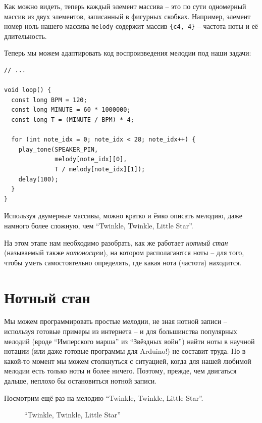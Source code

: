 \documentclass[a4paper,twoside]{book}
\begin{document}
Как можно видеть, теперь каждый элемент массива -- это по сути одномерный массив
из двух элементов, записанный в фигурных скобках. Например, элемент номер ноль
нашего массива \texttt{melody} содержит массив \texttt{\{c4, 4\}} -- частота ноты
и её длительность.

Теперь мы можем адаптировать код воспроизведения мелодии под наши задачи:

\begin{verbatim}
// ...

void loop() {
  const long BPM = 120;
  const long MINUTE = 60 * 1000000;
  const long T = (MINUTE / BPM) * 4;

  for (int note_idx = 0; note_idx < 28; note_idx++) {
    play_tone(SPEAKER_PIN,
              melody[note_idx][0],
              T / melody[note_idx][1]);
    delay(100);
  }
}
\end{verbatim}

Используя двумерные массивы, можно кратко и ёмко описать мелодию, даже намного
более сложную, чем ``Twinkle, Twinkle, Little Star''.

На этом этапе нам необходимо разобрать, как же работает \emph{нотный стан}
(называемый также \emph{нотоносцем}), на котором располагаются ноты -- для того,
чтобы уметь самостоятельно определять, где какая нота (частота) находится.

\section{Нотный стан}

Мы можем программировать простые мелодии, не зная нотной записи -- используя
готовые примеры из интернета -- и для большинства популярных мелодий (вроде
``Имперского марша'' из ``Звёздных войн'') найти ноты в научной нотации (или даже
готовые программы для Arduino!) не составит труда. Но в какой-то момент мы можем
столкнуться с ситуацией, когда для нашей любимой мелодии есть только ноты и
более ничего. Поэтому, прежде, чем двигаться дальше, неплохо бы остановиться
нотной записи.

Посмотрим ещё раз на мелодию ``Twinkle, Twinkle, Little Star''.

\begin{figure}[ht]
  \caption{``Twinkle, Twinkle, Little Star''}
  \centering
  \label{fig:sound-fig-4}
\end{figure}
\end{document}
